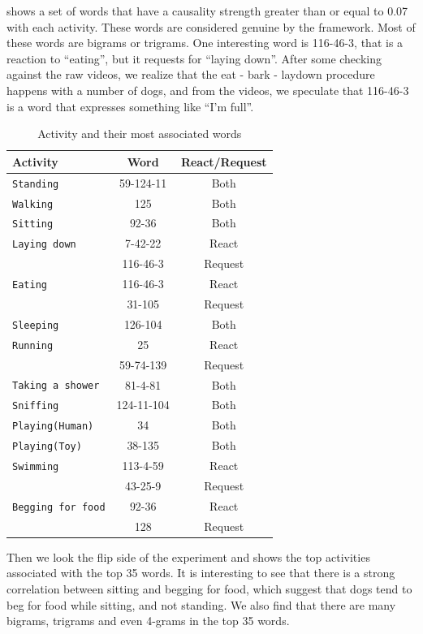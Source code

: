  shows a set of words that have a causality strength
greater than or equal to 0.07 with each activity. These words are considered
genuine by the framework. Most of these words are bigrams or trigrams. 
One interesting word is 116-46-3, that is a reaction to ``eating'', but it requests
for ``laying down''. After some checking against the raw videos, we realize that 
the eat - bark - laydown procedure happens with a number of dogs, and from the videos, 
we speculate that 116-46-3 is a word that expresses something like ``I'm full''.

\begin{table}[th]
\centering
\small
\begin{tabular}{lcc}
\hline
\textbf{Activity} & \textbf{Word} & \textbf{React/Request}\\
\hline
\verb|Standing| & 59-124-11 & Both \\
\verb|Walking| & 125 & Both\\
\verb|Sitting| & 92-36 & Both \\
\verb|Laying down| & 7-42-22 & React \\
& 116-46-3 & Request \\
\verb|Eating| & 116-46-3 & React\\
& 31-105 & Request \\
\verb|Sleeping| & 126-104 & Both \\
\verb|Running| & 25 & React \\
& 59-74-139 & Request \\
\verb|Taking a shower| & 81-4-81 & Both \\
\verb|Sniffing| & 124-11-104 & Both \\
\verb|Playing(Human)| & 34 & Both \\
\verb|Playing(Toy)| & 38-135 & Both \\
\verb|Swimming| & 113-4-59 & React\\
& 43-25-9 & Request \\
\verb|Begging for food| & 92-36 & React \\
& 128 & Request \\\hline
\end{tabular}
\caption{Activity and their most associated words}
\label{tab:actword}
\end{table}

Then we look the flip side of the experiment and
 shows the top activities associated with the top 35 words.
It is interesting to see that there is a strong correlation
between sitting and begging for food, which suggest that
dogs tend to beg for food while sitting, and not standing.
We also find that there are many bigrams, trigrams and even
4-grams in the top 35 words.

